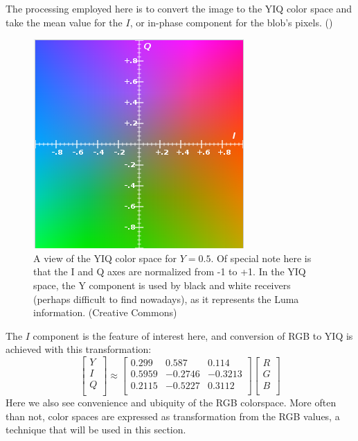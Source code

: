 \documentclass[letterpaper]{article}
\begin{document}
{The processing employed here is to convert the image to the YIQ color space and take the mean value for the $I$, or in-phase component for the blob's pixels. (\cite{MathWorks_undated-jg})
\begin{figure}[h!]
	\centering
	\includegraphics[scale=0.4]{./figures/yiq.png}
	\caption[YIQ color space at $Y = 0.5$]{A view of the YIQ color space for $Y=0.5$. Of special note here is that the I and Q axes are normalized from -1 to +1. In the YIQ space, the Y component is used by black and white receivers (perhaps difficult to find nowadays), as it represents the Luma information. (Creative Commons)}
	\label{fig:yiq-space}
\end{figure}
The $I$ component is the feature of interest here, and conversion of RGB to YIQ is achieved with this transformation:
\begin{equation}
	\begin{bmatrix}
	Y \\[0.3em]
	I \\[0.3em]
	Q \\[0.3em]
	\end{bmatrix}
	\approx
	\begin{bmatrix}
	0.299 & 0.587 & 0.114 \\[0.3em]
	0.5959 & -0.2746 & -0.3213\\[0.3em]
	0.2115 & -0.5227 & 0.3112 \\[0.3em]
	\end{bmatrix}
	\begin{bmatrix}
	R \\[0.3em]
	G \\[0.3em]
	B \\[0.3em]
	\end{bmatrix}	
\end{equation}
Here we also see convenience and ubiquity of the RGB colorspace. More often than not, color spaces are expressed as transformation from the RGB values, a technique that will be used in this section.

}
\end{document}

